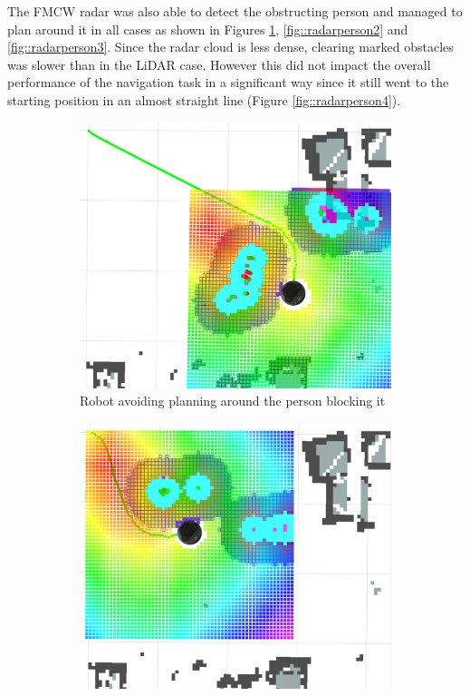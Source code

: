 The \ac{FMCW} \ac{radar} was also able to detect the obstructing person and managed to plan around it in all cases as shown in Figures \ref{fig::radarperson1}, \ref{fig::radarperson2} and \ref{fig::radarperson3}. Since the radar cloud is less dense, clearing marked obstacles was slower than in the \ac{LiDAR} case. However this did not impact the overall performance of the navigation task in a significant way since it still went to the starting position in an almost straight line (Figure \ref{fig::radarperson4}).
\begin{figure}[ht!]
  \centering
  \begin{subfigure}[b]{0.49\linewidth}
    \includegraphics[width=\linewidth]{imgs/chapter5/radarperson1.png}
     \caption{Robot avoiding planning around the person blocking it}
     \label{fig::radarperson1}
  \end{subfigure}
  \begin{subfigure}[b]{0.49\linewidth}
    \includegraphics[width=\linewidth]{imgs/chapter5/radarperson2.png}

\end{subfigure}
\end{figure}

